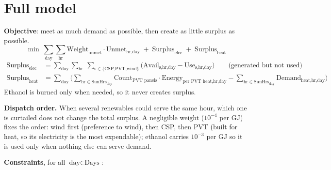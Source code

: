\documentclass[11pt,a4paper]{article}
\newcommand{\T}[1]{\text{#1}}
\begin{document}
\section{Full model}
\textbf{Objective}: meet as much demand as possible, then create as little surplus as possible.
\[
\min\ \sum_{\T{day}}\sum_{\T{hr}}\T{Weight}_{\T{unmet}}\cdot\T{Unmet}_{\T{hr,day}}\;+\;\T{Surplus}_{\T{elec}}\;+\;\T{Surplus}_{\T{heat}}
\]
\begin{align*}
\T{Surplus}_{\T{elec}}&=\sum_{\T{day}}\sum_{\T{hr}}\ \sum_{\T{s}\in\{\T{CSP,PVT,wind}\}}\big(\T{Avail}_{\T{s,hr,day}}-\T{Use}_{\T{s,hr,day}}\big)\qquad\text{(generated but not used)}\\
\T{Surplus}_{\T{heat}}&=\sum_{\T{day}}\Big(\sum_{\T{hr}\in\T{SunHrs}_{\T{day}}}\T{Count}_{\T{PVT panels}}\cdot\T{Energy}_{\T{per PVT heat,hr,day}}-\sum_{\T{hr}\in\T{SunHrs}_{\T{day}}}\T{Demand}_{\T{heat,hr,day}}\Big)
\end{align*}
Ethanol is burned only when needed, so it never creates surplus.

\textbf{Dispatch order.} When several renewables could serve the same hour, which one is curtailed does not change the total surplus. A negligible weight ($10^{-4}$ per GJ) fixes the order: wind first (preference to wind), then CSP, then PVT (built for heat, so its electricity is the most expendable); ethanol carries $10^{-3}$ per GJ so it is used only when nothing else can serve demand.

\textbf{Constraints}, for all $\T{day}\in\T{Days}$:
\end{document}
